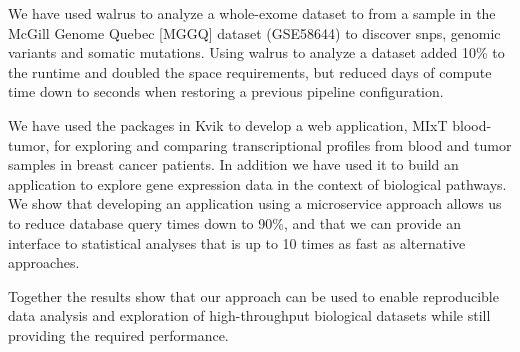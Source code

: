 We have used walrus to analyze a whole-exome dataset to from a sample in the
McGill Genome Quebec [MGGQ] dataset (GSE58644)\cite{tofigh2014prognostic} to
discover \glspl{snp}, genomic variants and somatic mutations. Using walrus to
analyze a dataset added 10\% to the runtime and doubled the space requirements,
but reduced days of compute time down to seconds when restoring a previous
pipeline configuration. 

We have used the packages in Kvik to develop a web application, MIxT
blood-tumor, for exploring and comparing transcriptional profiles from blood and
tumor samples in breast cancer patients. 
In addition we have used it to build an
application to explore gene expression data in the context of biological
pathways. We show that developing an application using a microservice approach
allows us to reduce database query times down to 90\%, and that we can provide
an interface to statistical analyses that is up to 10 times as fast as
alternative approaches. 

Together the results show that our approach can be used to enable reproducible
data analysis and exploration of high-throughput biological datasets while still
providing the required performance. 

